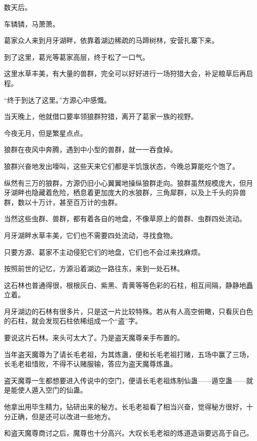 
\begin{this_body}

数天后。

车辚辚，马萧萧。

葛家众人来到月牙湖畔，依靠着湖边稀疏的马蹄树林，安营扎寨下来。

到了这里，葛光等葛家高层，终于松了一口气。

这里水草丰美，有大量的兽群，完全可以好好进行一场狩猎大会，补足粮草后再启程。

“终于到达了这里。”方源心中感慨。

当天晚上，他就借口要率领狼群狩猎，离开了葛家一族的视野。

今夜无月，但是繁星点点。

狼群在夜风中奔腾，遇到中小型的兽群，就一一吞食掉。

狼群兴奋地发出嚎叫，这些天来它们都是半饥饿状态，今晚总算能吃个饱了。

纵然有三万的狼群，方源仍旧小心翼翼地操纵狼群走向。狼群虽然规模庞大，但月牙湖畔也隐藏着危险，栖息着更加庞大的水狼群，三角犀群，以及上千头的异兽群，数以十万计，甚至百万计的虫群。

当然这些虫群、兽群，都有着各自的地盘，不像草原上的兽群、虫群四处流动。

月牙湖畔水草丰美，它们也不需要四处流动，寻找食物。

只要方源、葛家不主动侵犯它们的地盘，它们也不会过来找麻烦。

按照前世的记忆，方源沿着湖边一路往东，来到一处石林。

这石林也普通得很，根根灰白、紫黑、青黄等等色彩的石柱，相互间隔，静静地矗立着。

月牙湖边的石林有很多片，只是这一片比较特殊。若从有人高空俯瞰，只看灰白色的石柱，就会发现石柱依稀组成一个“盗”字。

要说这片石林。来头可太大了。乃是盗天魔尊亲手布置的。

当年盗天魔尊为了请长毛老祖，为其炼蛊，便和长毛老祖打赌，五场中赢了三场，长毛老祖惜败，不得不认赌服输，答应为盗天魔尊炼蛊。

盗天魔尊一生都想要进入传说中的空门，便请长毛老祖炼制仙蛊——遁空蛊——就是能使人遁入空门的仙蛊。

他拿出用毕生精力，钻研出来的秘方。长毛老祖看了相当兴奋，觉得秘方很好，十分正确，但是还可以改进一些地方。

和盗天魔尊商讨之后，魔尊也十分高兴。大叹长毛老祖的炼道造诣要远高于自己。


\end{this_body}
